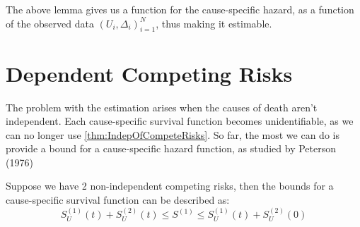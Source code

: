 \documentclass[10pt]{article}
\newcommand{\parenth}[1]{{\left(#1\right)}}
\begin{document}
The above lemma gives us a function for the cause-specific hazard, as a function of the observed data $(U_i, \Delta_i)_{i=1}^N$, thus making it estimable.

\section{Dependent Competing Risks}

The problem with the estimation arises when the causes of death aren't independent. Each cause-specific survival function becomes unidentifiable, as we can no longer use \cref{thm:IndepOfCompeteRisks}. So far, the most we can do is provide a bound for a cause-specific hazard function, as studied by Peterson (1976)

\begin{theorem}

Suppose we have 2 non-independent competing risks, then the bounds for a cause-specific survival function can be described as:
$$S_U^\parenth{1}(t) + S_U^\parenth{2}(t) \leq S^\parenth{1}\leq S_U^\parenth{1}(t) + S_U^\parenth{2}(0)$$
    
\end{theorem}
\end{document}
